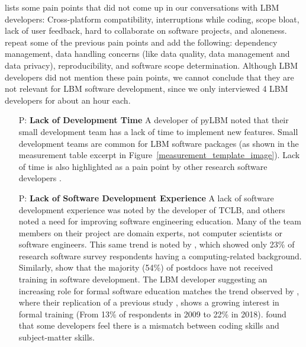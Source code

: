 \documentclass[runningheads]{llncs}
\newcounter{pnum} %
\begin{document}
\cite{PintoEtAl2018} lists some pain points that did not come up in our
conversations with LBM developers: Cross-platform compatibility, interruptions
while coding, scope bloat, lack of user feedback, hard to collaborate on
software projects, and aloneness. \cite{WieseEtAl2019} repeat some of the
previous pain points and add the following: dependency management, data handling
concerns (like data quality, data management and data privacy), reproducibility,
and software scope determination. Although LBM developers did not mention these
pain points, we cannot conclude that they are not relevant for LBM software
development, since we only interviewed 4 LBM developers for about an hour each.

\begin{enumerate}

	\item[P\refstepcounter{pnum}\thepnum \label{P_LackDevTime}:] \textbf{Lack of
	Development Time} A developer of pyLBM noted that their small development
	team has a lack of time to implement new features. Small development teams
	are common for LBM software packages (as shown in the measurement table
	excerpt in Figure~\ref{measurement_template_image}). Lack of time is also
	highlighted as a pain point by other research software developers
	\cite{PintoEtAl2018,PintoEtAl2016,WieseEtAl2019}.

	\item[P\refstepcounter{pnum}\thepnum \label{P_LackSoftDevExp}:] \textbf{Lack
	of Software Development Experience} A lack of software development
	experience was noted by the developer of TCLB, and others noted a need for
	improving software engineering education. Many of the team members on their
	project are domain experts, not computer scientists or software engineers.
	This same trend is noted by \cite{Nguyen-HoanEtAl2010}, which showed only
	23\% of research software survey respondents having a computing-related
	background. Similarly, \cite{UditAndKatz2017} show that the majority (54\%)
	of postdocs have not received training in software development.  The LBM
	developer suggesting an increasing role for formal software education
	matches the trend observed by \cite{PintoEtAl2018}, where their replication
	of a previous study \cite{HannayEtAl2009}, shows a growing interest in
	formal training (From 13\% of respondents in 2009 to 22\% in 2018).
	\cite{PintoEtAl2018} found that some developers feel there is a mismatch
	between coding skills and subject-matter skills. 
	

\end{enumerate}
\end{document}
